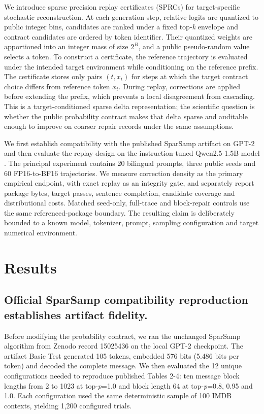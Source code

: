 \documentclass{nature}
\begin{document}
We introduce sparse precision replay certificates (SPRCs) for target-specific stochastic reconstruction. At each generation step, relative logits are quantized to public integer bins, candidates are ranked under a fixed top-\textit{k} envelope and contract candidates are ordered by token identifier. Their quantized weights are apportioned into an integer mass of size \(2^B\), and a public pseudo-random value selects a token. To construct a certificate, the reference trajectory is evaluated under the intended target environment while conditioning on the reference prefix. The certificate stores only pairs \((t,x_t)\) for steps at which the target contract choice differs from reference token \(x_t\). During replay, corrections are applied before extending the prefix, which prevents a local disagreement from cascading. This is a target-conditioned sparse delta representation; the scientific question is whether the public probability contract makes that delta sparse and auditable enough to improve on coarser repair records under the same assumptions.

We first establish compatibility with the published SparSamp artifact on GPT-2 and then evaluate the replay design on the instruction-tuned Qwen2.5-1.5B model \cite{ref3,ref6}. The principal experiment contains 20 bilingual prompts, three public seeds and 60 FP16-to-BF16 trajectories. We measure correction density as the primary empirical endpoint, with exact replay as an integrity gate, and separately report package bytes, target passes, sentence completion, candidate coverage and distributional costs. Matched seed-only, full-trace and block-repair controls use the same referenced-package boundary. The resulting claim is deliberately bounded to a known model, tokenizer, prompt, sampling configuration and target numerical environment.

\section*{Results}

\subsection{Official SparSamp compatibility reproduction establishes artifact fidelity.}
Before modifying the probability contract, we ran the unchanged SparSamp algorithm from Zenodo record 15025436 on the local GPT-2 checkpoint. The artifact Basic Test generated 105 tokens, embedded 576 bits (5.486 bits per token) and decoded the complete message. We then evaluated the 12 unique configurations needed to reproduce published Tables 2-4: ten message block lengths from 2 to 1023 at top-\textit{p}=1.0 and block length 64 at top-\textit{p}=0.8, 0.95 and 1.0. Each configuration used the same deterministic sample of 100 IMDB contexts, yielding 1,200 configured trials.
\end{document}
